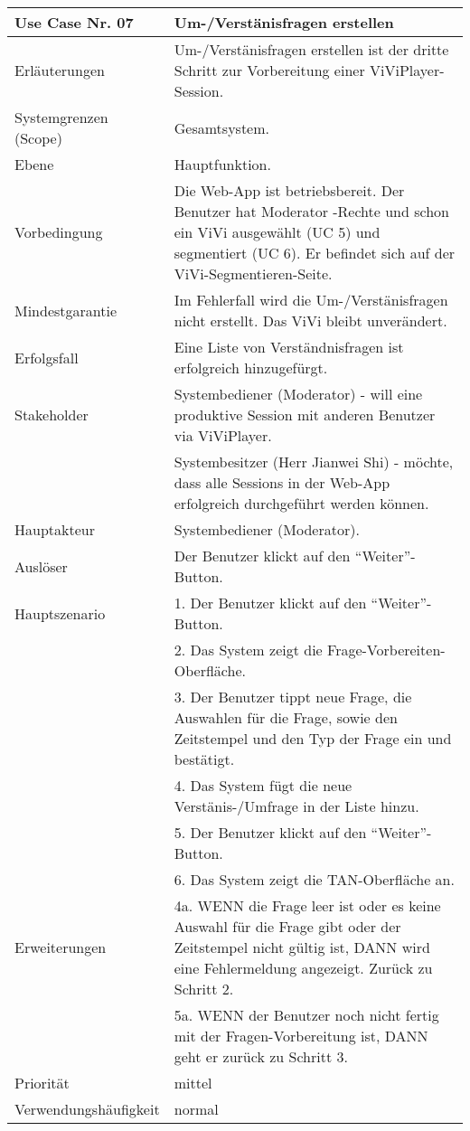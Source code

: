 \begin{tabularx}{\linewidth}{|l|X|}
	\hline
	Use Case Nr. 07			& \textbf{Um-/Verstänisfragen erstellen} \\ \hline
	Erläuterungen			& Um-/Verstänisfragen erstellen ist der dritte Schritt zur 
							  Vorbereitung einer ViViPlayer-Session. \\ \hline
	Systemgrenzen (Scope)	& Gesamtsystem. \\ \hline
	Ebene					& Hauptfunktion. \\ \hline
	Vorbedingung			& Die Web-App ist betriebsbereit. Der Benutzer hat Moderator
							  -Rechte und schon ein ViVi ausgewählt (UC 5) und segmentiert (UC 6). Er befindet sich auf der ViVi-Segmentieren-Seite. \\ \hline
	Mindestgarantie			& Im Fehlerfall wird die Um-/Verstänisfragen nicht erstellt. Das ViVi 
							  bleibt unverändert. \\ \hline
	Erfolgsfall    			& Eine Liste von Verständnisfragen ist erfolgreich hinzugefürgt.
							  \\ \hline
	Stakeholder				& Systembediener (Moderator) - will eine produktive Session mit 
							  anderen Benutzer via ViViPlayer. \\
							& Systembesitzer (Herr Jianwei Shi) - möchte, dass alle Sessions 
							  in der Web-App erfolgreich durchgeführt werden können. \\ \hline
	Hauptakteur				& Systembediener (Moderator). \\ \hline
	Auslöser				& Der Benutzer klickt auf den ``Weiter''-Button. \\ \hline	
	Hauptszenario			& 1. Der Benutzer klickt auf den ``Weiter''-Button. \\  
							& 2. Das System zeigt die Frage-Vorbereiten-Oberfläche. \\
							& 3. Der Benutzer tippt neue Frage, die Auswahlen für die 
							  Frage, sowie den Zeitstempel und den Typ der Frage ein und 
							  bestätigt. \\ 
							& 4. Das System fügt die neue Verstänis-/Umfrage in der Liste 
							  hinzu. \\ 
							& 5. Der Benutzer klickt auf den ``Weiter''-Button. \\ 
							& 6. Das System zeigt die TAN-Oberfläche an. \\ \hline
	Erweiterungen			& 4a. WENN die Frage leer ist oder es keine Auswahl für die 
							  Frage gibt oder der Zeitstempel nicht gültig ist, DANN wird eine 
							  Fehlermeldung angezeigt. Zurück zu Schritt 2. \\ 
							& 5a. WENN der Benutzer noch nicht fertig mit der 
							  Fragen-Vorbereitung ist, DANN geht er zurück zu Schritt 3. \\ \hline
	Priorität				& mittel \\ \hline
	Verwendungshäufigkeit	& normal \\ \hline
\end{tabularx}